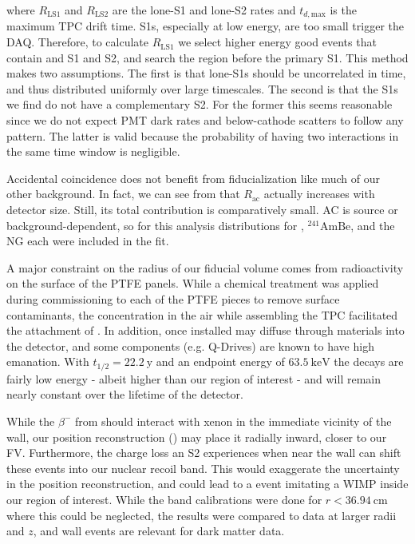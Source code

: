 \noindent where $R_{\mathrm{LS1}}$ and $R_{\mathrm{LS2}}$ are the lone-S1
and lone-S2 rates and $t_{d, \mathrm{max}}$ is the maximum TPC drift time.  S1s, especially at low energy, are too small trigger the
DAQ.  Therefore, to calculate $R_{\mathrm{LS1}}$ we select higher energy good events that contain and S1 and S2, and search the region
before the primary S1.  This method makes two assumptions.  The first is that lone-S1s should be uncorrelated in time, and thus
distributed uniformly over large timescales.  The second is that the S1s we find do not have a complementary S2.  For the former this
seems reasonable since we do not expect PMT dark rates and below-cathode scatters to follow any pattern.  The latter is valid because
the probability of having two interactions in the same time window is negligible.

Accidental coincidence does not benefit from fiducialization like much of our other background.  In fact, we can see from
 that $R_{\mathrm{ac}}$ actually increases
with detector size.  Still, its total contribution is comparatively small.  AC is source or background-dependent, so for this analysis
distributions for , $\mathrm{^{241}AmBe}$, and the NG each were included in the fit.

A major constraint on the radius of our fiducial volume comes from radioactivity on the surface of the PTFE panels.  While a chemical
treatment was applied during commissioning to each of the PTFE pieces to remove surface contaminants, the  concentration in
the air while assembling the TPC facilitated the attachment of .  In addition, once installed  may diffuse
through materials into the detector, and some components (e.g. Q-Drives) are known to have high emanation.  With
$t_{1/2} = 22.2\ \mathrm{y}$ and an endpoint energy of $63.5\ \mathrm{keV}$ the  decays are fairly low energy - albeit higher
than our region of interest - and will remain nearly constant over the lifetime of the detector.

While the $\beta^-$ from  should interact with xenon in the immediate vicinity of the wall, our position reconstruction
() may place it radially inward, closer to our FV.  Furthermore, the charge loss an S2
experiences when near the wall can shift these events into our nuclear recoil band.  This would exaggerate the uncertainty in the position
reconstruction, and could lead to a  event imitating a WIMP inside our region of interest.  While the band calibrations were
done for $r < 36.94\ \mathrm{cm}$ where this could be neglected, the results were compared to data at larger radii and $z$, and wall
events are relevant for dark matter data.

